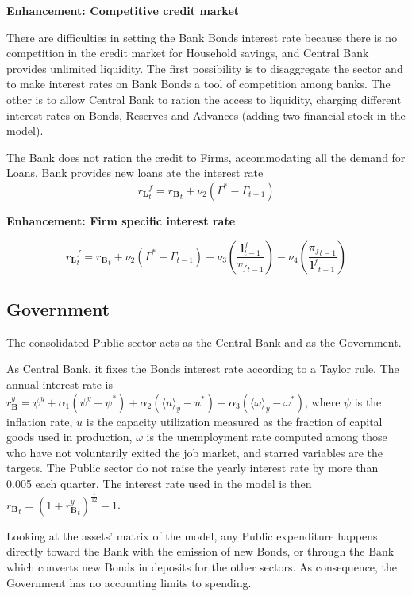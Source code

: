 \documentclass[a4paper, headings=standardclasses]{scrartcl}
\numberwithin{equation}{subsection}
\newenvironment{enh}[1][]{\begin{framed}\noindent\textbf{Enhancement: #1}\par}{\end{framed}}
\begin{document}
\begin{enh}[Competitive credit market]
    There are difficulties in setting the Bank Bonds interest rate because there is no competition in the credit market for Household savings, and Central Bank provides unlimited liquidity.
    The first possibility is to disaggregate the sector and to make interest rates on Bank Bonds a tool of competition among banks.
    The other is to allow Central Bank to ration the access to liquidity, charging different interest rates on Bonds, Reserves and Advances (adding two financial stock in the model).
\end{enh}

The Bank does not ration the credit to Firms, accommodating all the demand for Loans.
Bank provides new loans ate the interest rate $${r_\mathbf{L}}^f_t = {r_\mathbf{B}}_t + \nu_2 (\Gamma^* - \Gamma_{t-1})$$

\begin{enh}[Firm specific interest rate]
    $${r_\mathbf{L}}^f_t = {r_\mathbf{B}}_t + \nu_2 (\Gamma^* - \Gamma_{t-1}) + \nu_3 (\frac{\mathbf{l}^f_{t-1}}{{v_f}_{t-1}}) - \nu_4 (\frac{{\pi_f}_{t-1}}{{\mathbf{l}^f}_{t-1}})$$
\end{enh}

\subsection{Government}
The consolidated Public sector acts as the Central Bank and as the Government.

As Central Bank, it fixes the Bonds interest rate according to a Taylor rule.
The annual interest rate is ${r_\mathbf{B}^y} = \psi^y + \alpha_1 (\psi^y - \psi^*) + \alpha_2 (\langle u \rangle_y - u^*) - \alpha_3 (\langle \omega \rangle_y - \omega^*)$, where $\psi$ is the inflation rate, $u$ is the capacity utilization measured as the fraction of capital goods used in production, $\omega$ is the unemployment rate computed among those who have not voluntarily exited the job market, and starred variables are the targets. The Public sector do not raise the yearly interest rate by more than 0.005 each quarter. The interest rate used in the model is then ${r_\mathbf{B}}_t = (1 + {r_\mathbf{B}^y}_t)^{\frac{1}{12}} - 1$.

Looking at the assets' matrix of the model, any Public expenditure happens directly toward the Bank with the emission of new Bonds, or through the Bank which converts new Bonds in deposits for the other sectors. As consequence, the Government has no accounting limits to spending.
\end{document}
